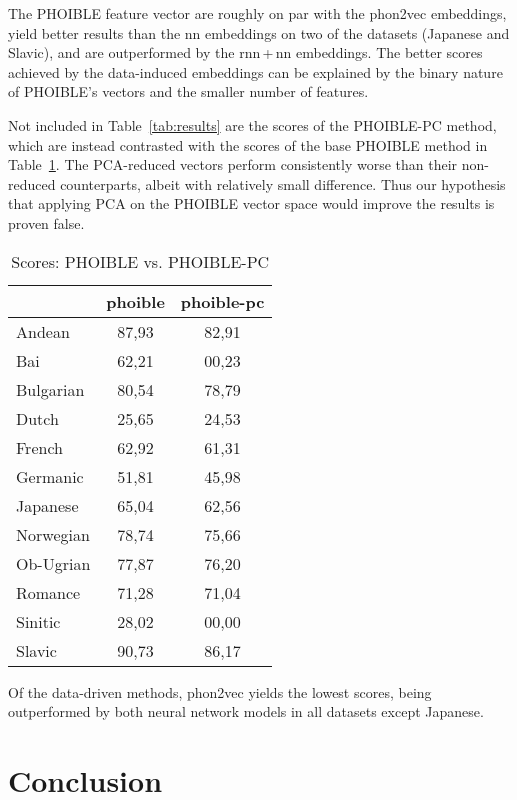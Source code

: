 \documentclass[a4paper]{report}
\begin{document}
The PHOIBLE feature vector are roughly on par with the phon2vec embeddings,
yield better results than the nn embeddings on two of the datasets (Japanese and Slavic), and are outperformed by the rnn\,+\,nn embeddings.
The better scores achieved by the data-induced embeddings can be explained by the binary nature of PHOIBLE's vectors and the smaller number of features.

Not included in Table~\ref{tab:results} are the scores of the PHOIBLE-PC method,
which are instead contrasted with the scores of the base PHOIBLE method in Table~\ref{tab:phoible}.
The PCA-reduced vectors perform consistently worse than their non-reduced counterparts, albeit with relatively small difference.
Thus our hypothesis that applying PCA on the PHOIBLE vector space would improve the results is proven false.

\begin{table}[h]
	\centering\small
	\begin{tabular}{l *{2}{c}}
		\toprule
		& phoible & phoible-pc \\
		\midrule
		Andean		&	87,93 &	82,91 \\
		Bai			&	62,21 &	00,23 \\
		Bulgarian	&	80,54 &	78,79 \\
		Dutch		&	25,65 &	24,53 \\
		French		&	62,92 &	61,31 \\
		Germanic	&	51,81 &	45,98 \\
		Japanese	&	65,04 &	62,56 \\
		Norwegian	&	78,74 &	75,66 \\
		Ob-Ugrian	&	77,87 &	76,20 \\
		Romance		&	71,28 &	71,04 \\
		Sinitic		&	28,02 &	00,00 \\
		Slavic		&	90,73 &	86,17 \\
		\bottomrule
	\end{tabular}
	\caption{Scores: PHOIBLE vs. PHOIBLE-PC}
	\label{tab:phoible}
\end{table}

Of the data-driven methods, phon2vec yields the lowest scores, being outperformed by both neural network models in all datasets except Japanese.


\chapter{Conclusion}



\end{document}
